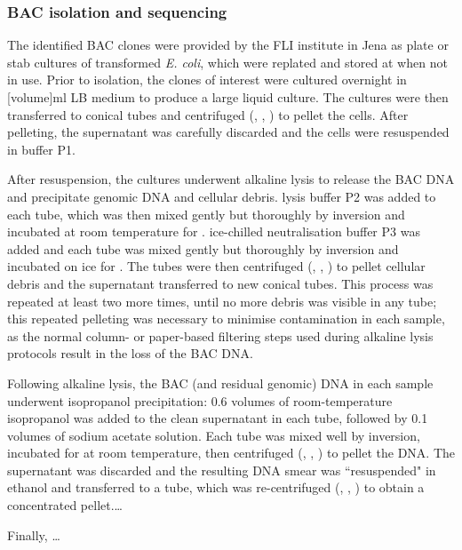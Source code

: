 \subsubsection{BAC isolation and sequencing}
\label{sec:bac-methods-isol}

The identified BAC clones were provided by the FLI institute in Jena as plate or stab cultures of transformed \textit{E. coli}, which were replated and stored at  when not in use. Prior to isolation, the clones of interest were cultured overnight in [volume]ml LB medium to produce a large liquid culture. The cultures were then transferred to  conical tubes and centrifuged (, , ) to pellet the cells. After pelleting, the supernatant was carefully discarded and the cells were resuspended in  buffer P1.

After resuspension, the cultures underwent alkaline lysis to release the BAC DNA and precipitate genomic DNA and cellular debris.  lysis buffer P2 was added to each tube, which was then mixed gently but thoroughly by inversion and incubated at room temperature for .  ice-chilled neutralisation buffer P3 was added and each tube was mixed gently but thoroughly by inversion and incubated on ice for . The tubes were then centrifuged (, , ) to pellet cellular debris and the supernatant transferred to new conical tubes. This process was repeated at least two more times, until no more debris was visible in any tube; this repeated pelleting was necessary to minimise contamination in each sample, as the normal column- or paper-based filtering steps used during alkaline lysis protocols result in the loss of the BAC DNA.

Following alkaline lysis, the BAC (and residual genomic) DNA in each sample underwent isopropanol precipitation: 0.6 volumes of room-temperature isopropanol was added to the clean supernatant in each tube, followed by 0.1 volumes of  sodium acetate solution. Each tube was mixed well by inversion, incubated for  at room temperature, then centrifuged (, , ) to pellet the DNA. The supernatant was discarded and the resulting DNA smear was ``resuspended" in   ethanol and transferred to a  tube, which was re-centrifuged (, , ) to obtain a concentrated pellet.\dots %

Finally, \dots %

